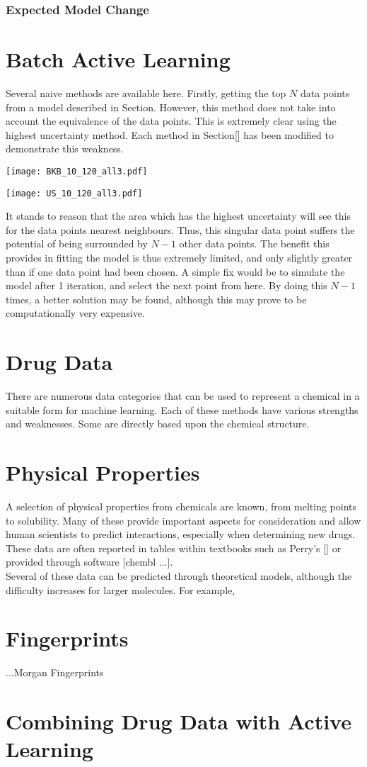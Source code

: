 \subsubsection{Expected Model Change}

\section{Batch Active Learning}
Several naive methods are available here. Firstly, getting the top $N$ data points from a model described in Section. However, this method does not take into account the equivalence of the data points. This is extremely clear using the highest uncertainty method. Each method in Section[] has been modified to demonstrate this weakness.

\begin{center}
  \texttt{[image: BKB\_10\_120\_all3.pdf]}
\end{center}
\begin{center}
  \texttt{[image: US\_10\_120\_all3.pdf]}
\end{center}

It stands to reason that the area which has the highest uncertainty will see this for the data points nearest neighbours. Thus, this singular data point suffers the potential of being surrounded by $N-1$ other data points. The benefit this provides in fitting the model is thus extremely limited, and only slightly greater than if one data point had been chosen. A simple fix would be to simulate the model after 1 iteration, and select the next point from here. By doing this $N-1$ times, a better solution may be found, although this may prove to be computationally very expensive.

\section{Drug Data}
There are numerous data categories that can be used to represent a chemical in a suitable form for machine learning. Each of these methods have various strengths and weaknesses. Some are directly based upon the chemical structure.
\section{Physical Properties}
A selection of physical properties from chemicals are known, from melting points to solubility. Many of these provide important aspects for consideration and allow human scientists to predict interactions, especially when determining new drugs. These data are often reported in tables within textbooks such as Perry's [] or provided through software [chembl ...].
\\
Several of these data can be predicted through theoretical models, although the difficulty increases for larger molecules. For example,
\blindtext[1]
\section{Fingerprints}
...Morgan Fingerprints
\blindtext[1]
\section{Combining Drug Data with Active Learning}
\blindtext[1]